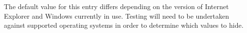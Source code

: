 The default value for this entry
differs depending on the version of Internet Explorer and Windows currently in
use. Testing will need to be undertaken against supported operating systems in
order to determine which values to hide.